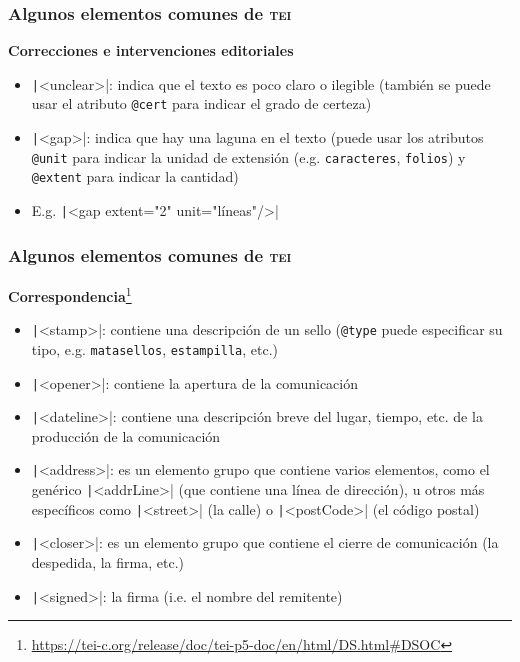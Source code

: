 \documentclass[%
  handout, %
  xcolor=svgnames]{beamer}
\newcommand*{\azul}[1]{\textcolor[HTML]{14145A}{#1}}
\newcommand*{\TEI}{\textsc{tei}}
\begin{document}
\begin{frame}
  \frametitle{Algunos elementos comunes de \TEI}

  \textbf{\azul{Correcciones e intervenciones editoriales}}

  \smallskip

  \begin{itemize}
      
    \item \texttt|<unclear>|: indica que el texto es poco claro o ilegible (también se puede usar el atributo \texttt{@cert} para indicar el grado de certeza)
    \item \texttt|<gap>|: indica que hay una laguna en el texto (puede usar los atributos \texttt{@unit} para indicar la unidad de extensión (e.g. \texttt{caracteres}, \texttt{folios}) y \texttt{@extent} para indicar la cantidad)
    \item[] E.g. \texttt|<gap extent="2" unit="líneas"/>|
  \end{itemize}
\end{frame}



\begin{frame}
  \frametitle{Algunos elementos comunes de \TEI}

  \textbf{\azul{Correspondencia}}\footnote{\url{https://tei-c.org/release/doc/tei-p5-doc/en/html/DS.html\#DSOC}}

  \smallskip

  \begin{itemize}
    \item \texttt|<stamp>|: contiene una descripción de un sello (\texttt{@type} puede especificar su tipo, e.g. \texttt{matasellos}, \texttt{estampilla}, etc.) 
    \item \texttt|<opener>|: contiene la apertura de la comunicación
    \item \texttt|<dateline>|: contiene una descripción breve del lugar, tiempo, etc. de la producción de la comunicación
    \item \texttt|<address>|: es un elemento grupo que contiene  varios elementos, como el genérico \texttt|<addrLine>| (que contiene una línea de dirección), u otros más específicos como \texttt|<street>| (la calle) o \texttt|<postCode>| (el código postal) 
    \item \texttt|<closer>|: es un elemento grupo que contiene el cierre de comunicación (la despedida, la firma, etc.) 
    \item \texttt|<signed>|: la firma (i.e. el nombre del remitente) 
  \end{itemize}

  
\end{frame}
\end{document}
